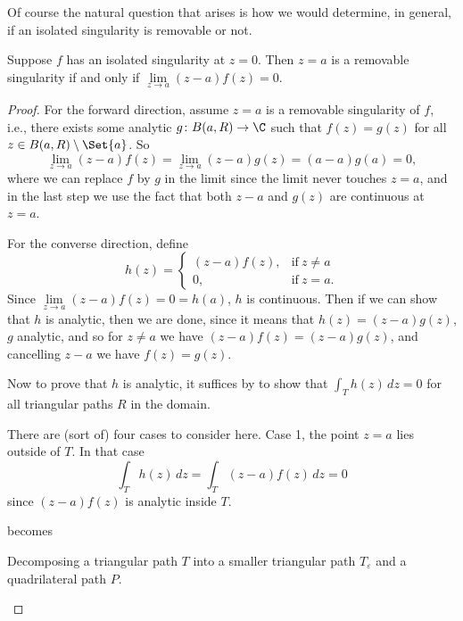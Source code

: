 Of course the natural question that arises is how we would determine, in general, if an isolated singularity is removable or not.

\begin{theorem}\label{thm5.1}
	Suppose $f$ has an isolated singularity at $z = 0$.
	Then $z = a$ is a removable singularity if and only if $\lim\limits_{z \to a} (z - a) f(z) = 0$.
\end{theorem}

\begin{proof}
	For the forward direction, assume $z = a$ is a removable singularity of $f$, i.e., there exists some analytic $g \colon B(a, R) \to \C$ such that $f(z) = g(z)$ for all $z \in B(a, R) \setminus \Set{a}$.
	So
	\[
		\lim_{z \to a} (z - a) f(z) = \lim_{z \to a} (z - a) g(z) = (a - a) g(a) = 0,
	\]
	where we can replace $f$ by $g$ in the limit since the limit never touches $z = a$, and in the last step we use the fact that both $z - a$ and $g(z)$ are continuous at $z = a$.

	For the converse direction, define
	\[
		h(z) = \begin{cases}
			(z - a) f(z), & \text{if}~ z \neq a \\
			0, & \text{if}~ z = a.
		\end{cases}
	\]
	Since $\lim\limits_{z \to a} (z - a)f(z) = 0 = h(a)$, $h$ is continuous.
	Then if we can show that $h$ is analytic, then we are done, since it means that $h(z) = (z - a) g(z)$, $g$ analytic, and so for $z \neq a$ we have $(z - a) f(z) = (z - a) g(z)$, and cancelling $z - a$ we have $f(z) = g(z)$.

	Now to prove that $h$ is analytic, it suffices by  to show that $\int_T h(z) \, d z = 0$ for all triangular paths $R$ in the domain.

	There are (sort of) four cases to consider here.
	Case 1, the point $z = a$ lies outside of $T$.
	In that case
	\[
		\int_T h(z) \, d z = \int_T (z - a) f(z) \, d z = 0
	\]
	since $(z - a) f(z)$ is analytic inside $T$.

	\begin{marginfigure}
		\centering

		becomes


		\caption{\label{fig:triangularpathepsilon} Decomposing a triangular path $T$ into a smaller triangular path $T_\varepsilon$ and a quadrilateral path $P$.}
	\end{marginfigure}


\end{proof}
